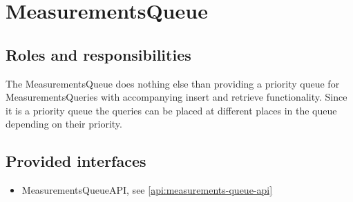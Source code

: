 \section{MeasurementsQueue}
\label{element:measurements-queue}

\subsection{Roles and responsibilities}

\npar The MeasurementsQueue does nothing else than providing a priority queue
for MeasurementsQueries with accompanying insert and retrieve functionality.
Since it is a priority queue the queries can be placed at different places in
the queue depending on their priority. 

\subsection{Provided interfaces}

\begin{itemize}
  \item MeasurementsQueueAPI, see \ref{api:measurements-queue-api}
\end{itemize}